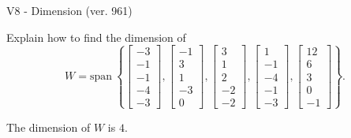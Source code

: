 \begin{exercise}
  \begin{exerciseTitle}V8 - Dimension (ver. 961)\end{exerciseTitle}
  \begin{exerciseStatement}
    Explain how to find the dimension of 
\[W=\mathrm{span}\ \left\{\left[\begin{array}{r}
-3 \\
-1 \\
-1 \\
-4 \\
-3
\end{array}\right] , \left[\begin{array}{r}
-1 \\
3 \\
1 \\
-3 \\
0
\end{array}\right] , \left[\begin{array}{r}
3 \\
1 \\
2 \\
-2 \\
-2
\end{array}\right] , \left[\begin{array}{r}
1 \\
-1 \\
-4 \\
-1 \\
-3
\end{array}\right] , \left[\begin{array}{r}
12 \\
6 \\
3 \\
0 \\
-1
\end{array}\right]\right\}.\]



  \end{exerciseStatement}
  \begin{exerciseAnswer}
   The dimension of \(W\) is  \(4\).
  


  \end{exerciseAnswer}
\end{exercise}